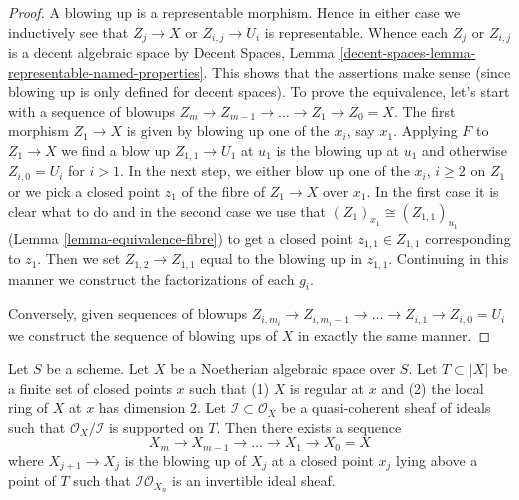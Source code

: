 \begin{proof}
A blowing up is a representable morphism. Hence in either case
we inductively see that $Z_j \to X$ or $Z_{i, j} \to U_i$ is
representable. Whence each $Z_j$ or $Z_{i, j}$ is a decent
algebraic space by Decent Spaces, Lemma
\ref{decent-spaces-lemma-representable-named-properties}.
This shows that the assertions make sense (since blowing up
is only defined for decent spaces).
To prove the equivalence, let's start with a sequence of blowups
$Z_m \to Z_{m - 1} \to \ldots \to Z_1 \to Z_0 = X$.
The first morphism $Z_1 \to X$ is given
by blowing up one of the $x_i$, say $x_1$. Applying $F$
to $Z_1 \to X$ we find a blow up $Z_{1, 1} \to U_1$ at $u_1$
is the blowing up at $u_1$ and otherwise $Z_{i, 0} = U_i$ for $i > 1$.
In the next step, we either blow up one of the $x_i$, $i \geq 2$
on $Z_1$ or we pick a closed point $z_1$ of the fibre of $Z_1 \to X$
over $x_1$. In the first case it is clear what to do and in
the second case we use that $(Z_1)_{x_1} \cong (Z_{1, 1})_{u_1}$
(Lemma \ref{lemma-equivalence-fibre})
to get a closed point $z_{1, 1} \in Z_{1, 1}$ corresponding to $z_1$.
Then we set $Z_{1, 2} \to Z_{1, 1}$ equal to the blowing up
in $z_{1, 1}$. Continuing in this manner we construct the factorizations
of each $g_i$.

\medskip\noindent
Conversely, given sequences of blowups
$Z_{i, m_i} \to Z_{i, m_i - 1} \to \ldots \to Z_{i, 1} \to Z_{i, 0} = U_i$
we construct the sequence of blowing ups of $X$ in exactly the same manner.
\end{proof}

\begin{lemma}
\label{lemma-make-ideal-principal}
Let $S$ be a scheme. Let $X$ be a Noetherian algebraic space over $S$.
Let $T \subset |X|$ be a finite set of closed points $x$ such that
(1) $X$ is regular at $x$ and (2) the local ring of $X$ at $x$ has
dimension $2$. Let $\mathcal{I} \subset \mathcal{O}_X$ be a quasi-coherent
sheaf of ideals such that $\mathcal{O}_X/\mathcal{I}$ is supported on $T$.
Then there exists a sequence
$$
X_m \to X_{m - 1} \to \ldots \to X_1 \to X_0 = X
$$
where $X_{j + 1} \to X_j$ is the blowing up of $X_j$ at a closed
point $x_j$ lying above a point of $T$ such that
$\mathcal{I}\mathcal{O}_{X_n}$ is an invertible ideal sheaf.
\end{lemma}


